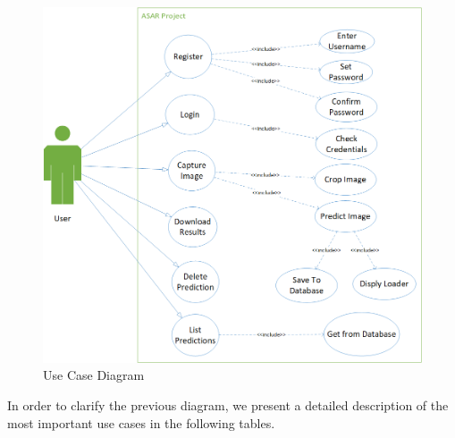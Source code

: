 \begin{figure}[H]
    \centering
    \includegraphics[width=14cm]{images/use case.png}
    \caption{Use Case Diagram}
    \label{fig:use-case-digram}
\end{figure}

\clearpage

\noindent
In order to clarify the previous diagram, we present a detailed description of the most important use cases in the following tables. \\

